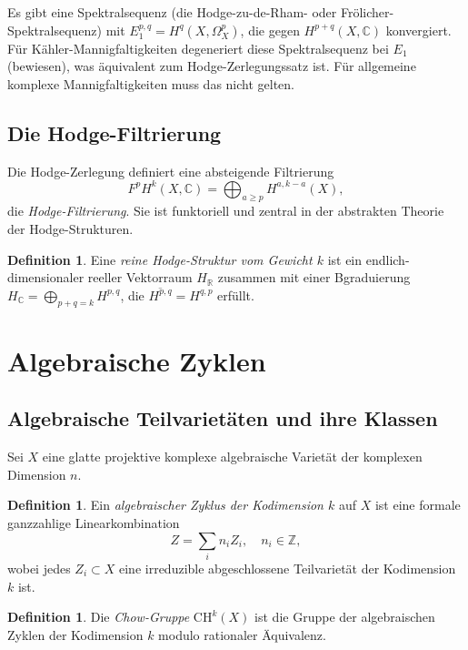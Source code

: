 \documentclass[12pt,a4paper]{amsart}
\theoremstyle{definition}
\newtheorem{definition}[theorem]{Definition}
\theoremstyle{remark}
\begin{document}
Es gibt eine Spektralsequenz (die Hodge-zu-de-Rham- oder Frölicher-Spektralsequenz)
mit $E_1^{p,q} = H^q(X, \Omega^p_X)$, die gegen $H^{p+q}(X, \mathbb{C})$ konvergiert.
Für Kähler-Mannigfaltigkeiten degeneriert diese Spektralsequenz bei $E_1$ (bewiesen),
was äquivalent zum Hodge-Zerlegungssatz ist. Für allgemeine komplexe Mannigfaltigkeiten
muss das nicht gelten.

\subsection{Die Hodge-Filtrierung}

Die Hodge-Zerlegung definiert eine absteigende Filtrierung
\[
  F^p H^k(X, \mathbb{C}) = \bigoplus_{a \ge p} H^{a,k-a}(X),
\]
die \emph{Hodge-Filtrierung}. Sie ist funktoriell und zentral in der abstrakten
Theorie der Hodge-Strukturen.

\begin{definition}
Eine \emph{reine Hodge-Struktur vom Gewicht $k$} ist ein endlich-dimensionaler reeller
Vektorraum $H_\mathbb{R}$ zusammen mit einer Bgraduierung
$H_\mathbb{C} = \bigoplus_{p+q=k} H^{p,q}$, die $\overline{H^{p,q}} = H^{q,p}$ erfüllt.
\end{definition}

\section{Algebraische Zyklen}
\label{sec:zyklen}

\subsection{Algebraische Teilvarietäten und ihre Klassen}

Sei $X$ eine glatte projektive komplexe algebraische Varietät der komplexen Dimension $n$.

\begin{definition}
Ein \emph{algebraischer Zyklus der Kodimension $k$} auf $X$ ist eine formale
ganzzahlige Linearkombination
\[
  Z = \sum_{i} n_i Z_i, \quad n_i \in \mathbb{Z},
\]
wobei jedes $Z_i \subset X$ eine irreduzible abgeschlossene Teilvarietät der Kodimension $k$ ist.
\end{definition}

\begin{definition}
Die \emph{Chow-Gruppe} $\mathrm{CH}^k(X)$ ist die Gruppe der algebraischen Zyklen
der Kodimension $k$ modulo rationaler Äquivalenz.
\end{definition}
\end{document}
